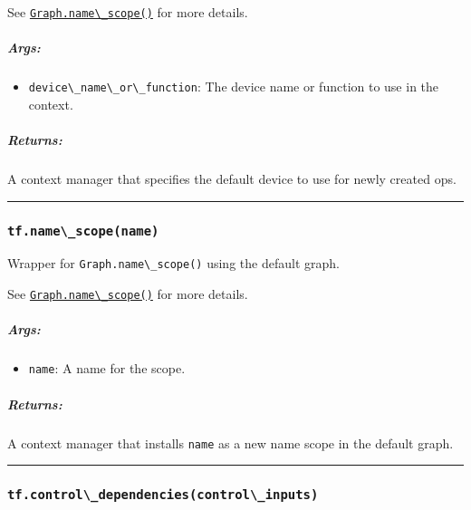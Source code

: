 See
\href{../../api_docs/python/framework.md\#Graph.name_scope}{\lstinline{Graph.name\_scope()}}
for more details.

\subparagraph{Args: }\label{args-21}

\begin{itemize}
\tightlist
\item
  \lstinline{device\_name\_or\_function}: The device name or function to
  use in the context.
\end{itemize}

\subparagraph{Returns: }\label{returns-24}

A context manager that specifies the default device to use for newly
created ops.

\begin{center}\rule{0.5\linewidth}{\linethickness}\end{center}

\subsubsection{\texorpdfstring{\lstinline{tf.name\_scope(name)}
}{tf.name\_scope(name) }}\label{tf.nameux5fscopename}

Wrapper for \lstinline{Graph.name\_scope()} using the default graph.

See
\href{../../api_docs/python/framework.md\#Graph.name_scope}{\lstinline{Graph.name\_scope()}}
for more details.

\subparagraph{Args: }\label{args-22}

\begin{itemize}
\tightlist
\item
  \lstinline{name}: A name for the scope.
\end{itemize}

\subparagraph{Returns: }\label{returns-25}

A context manager that installs \lstinline{name} as a new name scope in the
default graph.

\begin{center}\rule{0.5\linewidth}{\linethickness}\end{center}

\subsubsection{\texorpdfstring{\lstinline{tf.control\_dependencies(control\_inputs)}
}{tf.control\_dependencies(control\_inputs) }}\label{tf.controlux5fdependenciescontrolux5finputs}

